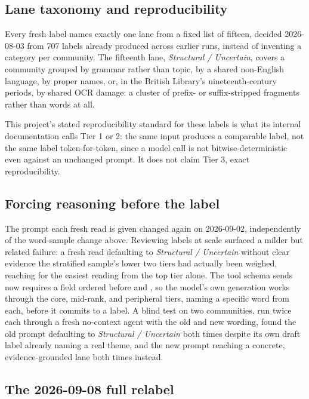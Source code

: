 \documentclass[11pt]{article}
\begin{document}
\subsection{Lane taxonomy and reproducibility}

Every fresh label names exactly one lane from a fixed list of fifteen,
decided 2026-08-03 from 707 labels already produced across earlier runs,
instead of inventing a category per community. The fifteenth lane,
\emph{Structural / Uncertain}, covers a community grouped by grammar
rather than topic, by a shared non-English language, by proper names,
or, in the British Library's nineteenth-century periods, by shared OCR
damage: a cluster of prefix- or suffix-stripped fragments rather than
words at all.

This project's stated reproducibility standard for these labels is what
its internal documentation calls Tier 1 or 2: the same input produces a
comparable label, not the same label token-for-token, since a model call
is not bitwise-deterministic even against an unchanged prompt. It does
not claim Tier 3, exact reproducibility.

\subsection{Forcing reasoning before the label}

The prompt each fresh read is given changed again on 2026-09-02,
independently of the word-sample change above. Reviewing labels at scale
surfaced a milder but related failure: a fresh read defaulting to
\emph{Structural / Uncertain} without clear evidence the stratified
sample's lower two tiers had actually been weighed, reaching for the
easiest reading from the top tier alone. The tool schema
 sends now requires a  field ordered
before  and , so the model's own generation works
through the core, mid-rank, and peripheral tiers, naming a specific word
from each, before it commits to a label. A blind test on two
communities, run twice each through a fresh no-context agent with the
old and new wording, found the old prompt defaulting to \emph{Structural
/ Uncertain} both times despite its own draft label already naming a
real theme, and the new prompt reaching a concrete, evidence-grounded
lane both times instead.

\subsection{The 2026-09-08 full relabel}
\end{document}
